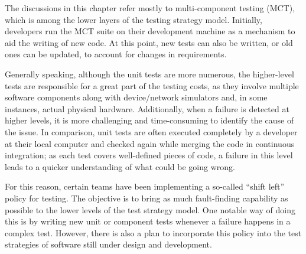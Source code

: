The discussions in this chapter refer mostly to multi-component testing (MCT), which is among the lower layers of the testing strategy model.
Initially, developers run the MCT suite on their development machine as a mechanism to aid the writing of new code.
At this point, new tests can also be written, or old ones can be updated, to account for changes in requirements.

Generally speaking, although the unit tests are more numerous, the higher-level tests are responsible for a great part of the testing costs, as they involve multiple software components along with device/network simulators and, in some instances, actual physical hardware.
Additionally, when a failure is detected at higher levels, it is more challenging and time-consuming to identify the cause of the issue.
In comparison, unit tests are often executed completely by a developer at their local computer and checked again while merging the code in continuous integration; as each test covers well-defined pieces of code, a failure in this level leads to a quicker understanding of what could be going wrong.

For this reason, certain teams have been implementing a so-called ``shift left'' policy for testing.
The objective is to bring as much fault-finding capability as possible to the lower levels of the test strategy model.
One notable way of doing this is by writing new unit or component tests whenever a failure happens in a complex test.
However, there is also a plan to incorporate this policy into the test strategies of software still under design and development.


